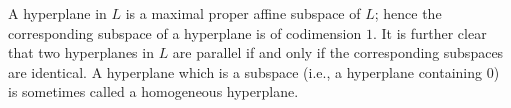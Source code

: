 A hyperplane in $L$ is a maximal proper affine subspace of $L$; hence the corresponding subspace of a hyperplane is of codimension $1$. It is further clear that two hyperplanes in $L$ are parallel if and only if the corresponding subspaces are identical. A hyperplane which is a subspace (i.e., a hyperplane containing $0$) is sometimes called a homogeneous hyperplane.
